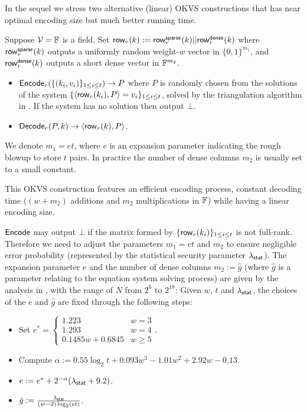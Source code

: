 In the sequel we stress two alternative (linear) OKVS constructions that has near optimal encoding size but much better running time. 

\begin{construction}\label{con:OKVS_sparse_matrix}
  Suppose $\mathcal{V}=\mathbb{F}$ is a field. Set ${\sf row}_r(k):={\sf row}_r^{\sf sparse}(k)||{\sf row}_r^{\sf dense}(k)$ where ${\sf row}_r^{\sf sparse}(k)$ outputs a uniformly random weight-$w$ vector in $\{0,1\}^{m_1}$, and ${\sf row}_r^{\sf dense}(k)$ outputs a short dense vector in $\mathbb{F}^{m_2}$. 
  \begin{itemize}
    \item ${\sf Encode}_r(\{(k_i,v_i)\}_{1\le i\le t}) \rightarrow P$ where $P$ is randomly chosen from the solutions of the system $\{\langle {\sf row}_r(k_i), P \rangle = v_i\}_{1\le i\le t}$, solved by the triangulation algorithm in \cite{cryptoeprint:2022/320}. If the system has no solution then output $\bot$. 
    \item ${\sf Decode}_r(P,k)\rightarrow \langle {\sf row}_r(k), P \rangle$. 
  \end{itemize}
  We denote $m_1=et$, where $e$ is an expansion parameter indicating the rough blowup to store $t$ pairs. In practice the number of dense columns $m_2$ is usually set to a small constant. 
\end{construction}
This OKVS construction features an efficient encoding process, constant decoding time ($(w+m_2)$ additions and $m_2$ multiplications in $\mathbb{F}$) while having a linear encoding size. 

${\sf Encode}$ may output $\bot$ if the matrix formed by $\{{\sf row}_r(k_i)\}_{1\le i\le t}$ is not full-rank. Therefore we need to adjust the parameters $m_1=et$ and $m_2$ to ensure negligible error probability (represented by the statistical security parameter $\lambda_{\sf stat}$). The expansion parameter $e$ and the number of dense columns $m_2:=\hat{g}$ (where $\hat{g}$ is a parameter relating to the equation system solving process) are given by the analysis in \cite{cryptoeprint:2022/320}, with the range of $N$ from $2^6$ to $2^{18}$: Given $w$, $t$ and $\lambda_{\sf stat}$, the choices of the $e$ and $\hat{g}$ are fixed through the following steps: 
\begin{itemize}
  \item Set $e^* = \begin{cases}
    1.223 & w=3\\
    1.293 & w=4\\
    0.1485w+0.6845 & w\ge 5
  \end{cases}$.
  \item Compute $\alpha:=0.55 \log_2 t + 0.093w^3-1.01w^2 + 2.92w-0.13$.
  \item $e:=e^*+ 2^{-\alpha}(\lambda_{\sf stat}+9.2)$. 
  \item $\hat{g}:=\frac{\lambda_{\sf stat}}{(w-2)\log_2(et)}$. 
\end{itemize}


